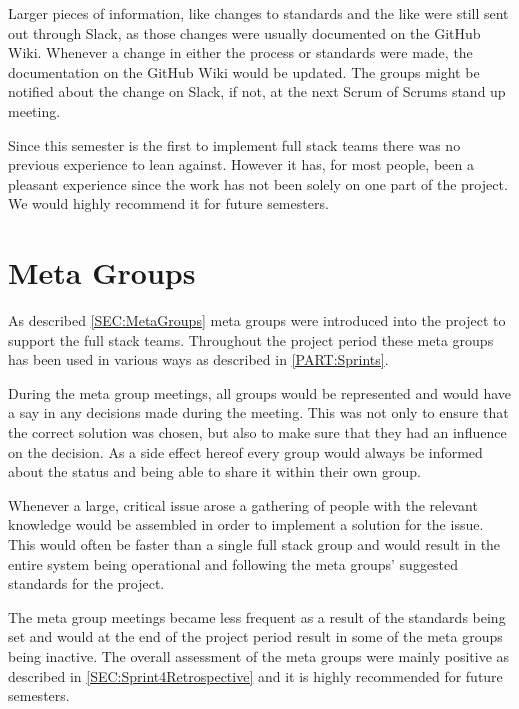 Larger pieces of information, like changes to standards and the like were still sent out through Slack, as those changes were usually documented on the GitHub Wiki.
Whenever a change in either the process or standards were made, the documentation on the GitHub Wiki would be updated. 
The groups might be notified about the change on Slack, if not, at the next Scrum of Scrums stand up meeting.

Since this semester is the first to implement full stack teams there was no previous experience to lean against. 
However it has, for most people, been a pleasant experience since the work has not been solely on one part of the project.
We would highly recommend it for future semesters.

\section{Meta Groups}
As described \autoref{SEC:MetaGroups} meta groups were introduced into the project to support the full stack teams.
Throughout the project period these meta groups has been used in various ways as described in \autoref{PART:Sprints}. 

During the meta group meetings, all groups would be represented and would have a say in any decisions made during the meeting.
This was not only to ensure that the correct solution was chosen, but also to make sure that they had an influence on the decision.
As a side effect hereof every group would always be informed about the status and being able to share it within their own group.

Whenever a large, critical issue arose a gathering of people with the relevant knowledge would be assembled in order to implement a solution for the issue. 
This would often be faster than a single full stack group and would result in the entire system being operational and following the meta groups' suggested standards for the project.
  
The meta group meetings became less frequent as a result of the standards being set and would at the end of the project period result in some of the meta groups being inactive.
The overall assessment of the meta groups were mainly positive as described in \autoref{SEC:Sprint4Retrospective} and it is highly recommended for future semesters.












































